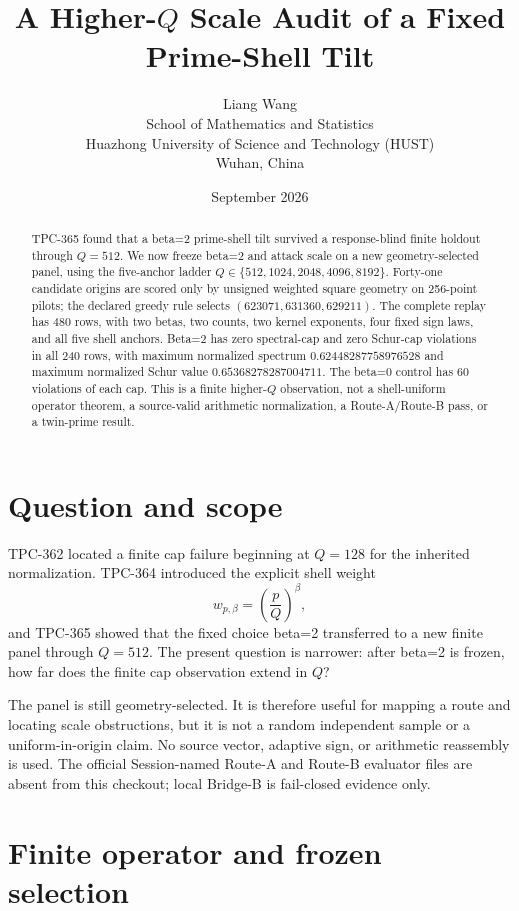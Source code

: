 \documentclass[10pt]{article}
\title{A Higher-$Q$ Scale Audit of a Fixed Prime-Shell Tilt}
\author{Liang Wang\\
\small School of Mathematics and Statistics\\
\small Huazhong University of Science and Technology (HUST)\\
\small Wuhan, China}
\date{September 2026}
\begin{document}
\maketitle

\begin{abstract}
TPC-365 found that a beta=2 prime-shell tilt survived a response-blind
finite holdout through $Q=512$.  We now freeze beta=2 and attack scale on a
new geometry-selected panel, using the five-anchor ladder
$Q\in\{512,1024,2048,4096,8192\}$.  Forty-one candidate origins are scored
only by unsigned weighted square geometry on 256-point pilots; the declared
greedy rule selects $(623071,631360,629211)$.  The complete replay has 480
rows, with two betas, two counts, two kernel exponents, four fixed sign laws,
and all five shell anchors.  Beta=2 has zero spectral-cap and zero Schur-cap
violations in all 240 rows, with maximum normalized spectrum
$0.62448287758976528$ and maximum normalized Schur value
$0.65368278287004711$.  The beta=0 control has 60 violations of each cap.
This is a finite higher-$Q$ observation, not a shell-uniform operator theorem,
a source-valid arithmetic normalization, a Route-A/Route-B pass, or a
twin-prime result.
\end{abstract}

\section{Question and scope}

TPC-362 located a finite cap failure beginning at $Q=128$ for the inherited
normalization.  TPC-364 introduced the explicit shell weight
\begin{equation}
        w_{p,\beta}=\left(\frac pQ\right)^\beta,
\end{equation}
and TPC-365 showed that the fixed choice beta=2 transferred to a new finite
panel through $Q=512$.  The present question is narrower: after beta=2 is
frozen, how far does the finite cap observation extend in $Q$?

The panel is still geometry-selected.  It is therefore useful for mapping a
route and locating scale obstructions, but it is not a random independent
sample or a uniform-in-origin claim.  No source vector, adaptive sign, or
arithmetic reassembly is used.  The official Session-named Route-A and
Route-B evaluator files are absent from this checkout; local Bridge-B is
fail-closed evidence only.

\section{Finite operator and frozen selection}
\end{document}
